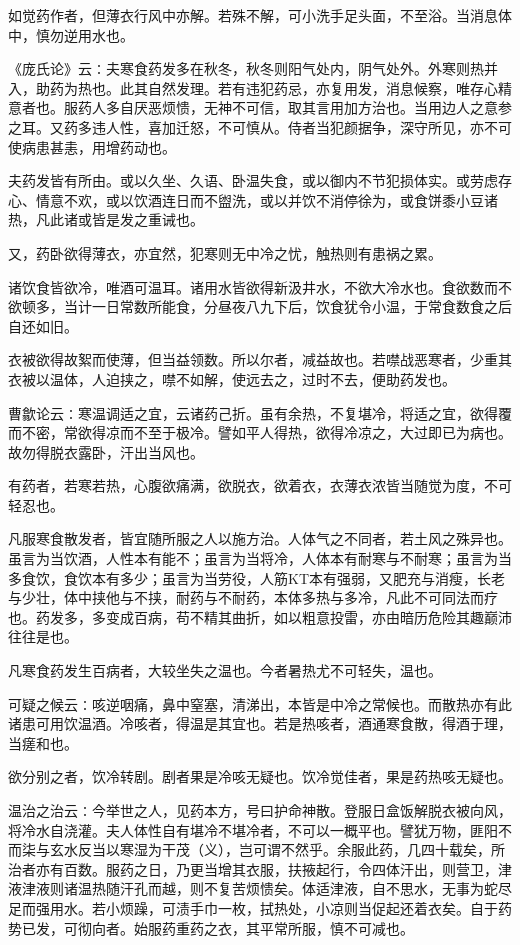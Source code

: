\documentclass[a4paper,12pt,UTF8,twoside]{ctexbook}
\begin{document}
如觉药作者，但薄衣行风中亦解。若殊不解，可小洗手足头面，不至浴。当消息体中，慎勿逆用水也。

《庞氏论》云∶夫寒食药发多在秋冬，秋冬则阳气处内，阴气处外。外寒则热并入，助药为热也。此其自然发理。若有违犯药忌，亦复用发，消息候察，唯存心精意者也。服药人多自厌恶烦愦，无神不可信，取其言用加方治也。当用边人之意参之耳。又药多违人性，喜加迁怒，不可慎从。侍者当犯颜据争，深守所见，亦不可使病患甚恚，用增药动也。

夫药发皆有所由。或以久坐、久语、卧温失食，或以御内不节犯损体实。或劳虑存心、情意不欢，或以饮酒连日而不盥洗，或以并饮不消停徐为，或食饼黍小豆诸热，凡此诸或皆是发之重诫也。

又，药卧欲得薄衣，亦宜然，犯寒则无中冷之忧，触热则有患祸之累。

诸饮食皆欲冷，唯酒可温耳。诸用水皆欲得新汲井水，不欲大冷水也。食欲数而不欲顿多，当计一日常数所能食，分昼夜八九下后，饮食犹令小温，于常食数食之后自还如旧。

衣被欲得故絮而使薄，但当益领数。所以尔者，减益故也。若噤战恶寒者，少重其衣被以温体，人迫挟之，噤不如解，使远去之，过时不去，便助药发也。

曹歙论云∶寒温调适之宜，云诸药己折。虽有余热，不复堪冷，将适之宜，欲得覆而不密，常欲得凉而不至于极冷。譬如平人得热，欲得冷凉之，大过即已为病也。故勿得脱衣露卧，汗出当风也。

有药者，若寒若热，心腹欲痛满，欲脱衣，欲着衣，衣薄衣浓皆当随觉为度，不可轻忍也。

凡服寒食散发者，皆宜随所服之人以施方治。人体气之不同者，若土风之殊异也。虽言为当饮酒，人性本有能不；虽言为当将冷，人体本有耐寒与不耐寒；虽言为当多食饮，食饮本有多少；虽言为当劳役，人筋KT本有强弱，又肥充与消瘦，长老与少壮，体中挟他与不挟，耐药与不耐药，本体多热与多冷，凡此不可同法而疗也。药发多，多变成百病，苟不精其曲折，如以粗意投雷，亦由暗历危险其趣巅沛往往是也。

凡寒食药发生百病者，大较坐失之温也。今者暑热尤不可轻失，温也。

可疑之候云∶咳逆咽痛，鼻中窒塞，清涕出，本皆是中冷之常候也。而散热亦有此诸患可用饮温酒。冷咳者，得温是其宜也。若是热咳者，酒通寒食散，得酒于理，当瘥和也。

欲分别之者，饮冷转剧。剧者果是冷咳无疑也。饮冷觉佳者，果是药热咳无疑也。

温治之治云∶今举世之人，见药本方，号曰护命神散。登服日盒饭解脱衣被向风，将冷水自浇灌。夫人体性自有堪冷不堪冷者，不可以一概平也。譬犹万物，匪阳不而柒与玄水反当以寒湿为干茂（义），岂可谓不然乎。余服此药，几四十载矣，所治者亦有百数。服药之日，乃更当增其衣服，扶掖起行，令四体汗出，则营卫，津液津液则诸温热随汗孔而越，则不复苦烦愦矣。体适津液，自不思水，无事为蛇尽足而强用水。若小烦躁，可渍手巾一枚，拭热处，小凉则当促起还着衣矣。自于药势已发，可彻向者。始服药重药之衣，其平常所服，慎不可减也。
\end{document}

